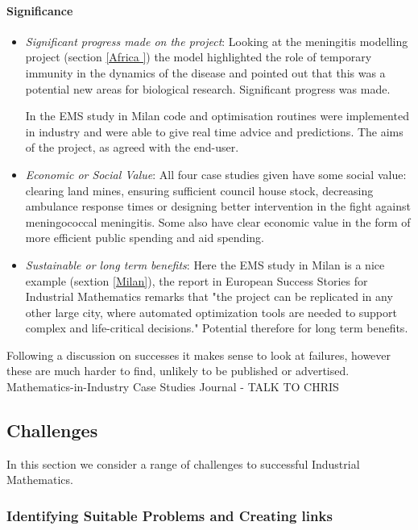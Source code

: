 \documentclass[11pt]{article} %
\begin{document}
\paragraph{Significance}
\begin{itemize}
	\item \textit{Significant progress made on the project}: Looking at the meningitis modelling project (section \ref{Africa }) the model highlighted the role of temporary immunity in the dynamics of the disease and pointed out that this was a   potential new areas for biological research. Significant progress was made. 
	
	In the EMS study in Milan code and optimisation routines were implemented in industry and were able to give real time advice and predictions. The aims of the project, as agreed with the end-user. 
	
	\item \textit{Economic or Social Value}: All four case studies given have some social value: clearing land mines, ensuring sufficient council house stock, decreasing ambulance response times or designing better intervention in the fight against meningococcal meningitis. Some also have clear economic value in the form of more efficient public spending and aid spending. 
	\item \textit{Sustainable or long term benefits}: Here the EMS study in Milan is a nice example (sextion \ref{Milan}), the report in European Success Stories for Industrial Mathematics \cite{European2011}  remarks that "the project can be replicated in any other large city, where automated optimization tools are needed to support complex and life-critical decisions." Potential therefore for long term benefits.
\end{itemize}



	Following a discussion on successes it makes sense to look at failures, however these are much harder to find, unlikely to be published or advertised. Mathematics-in-Industry Case Studies Journal - TALK TO CHRIS 
	
	\subsection{Challenges} 
	In this section we consider a range of challenges to successful Industrial Mathematics. 
	
	\subsubsection{Identifying Suitable Problems and Creating links} 
	
\end{document}

